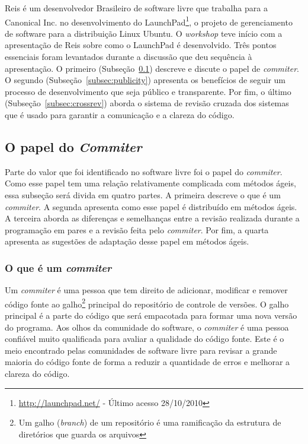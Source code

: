 Reis é um desenvolvedor Brasileiro de software livre que trabalha para
a Canonical Inc. no desenvolvimento do
LaunchPad\footnote{\url{http://launchpad.net/} - Último acesso
  28/10/2010}, o projeto de gerenciamento de software para a
distribuição Linux Ubuntu. O \emph{workshop} teve início com a
apresentação de Reis sobre como o LaunchPad é desenvolvido. Três
pontos essenciais foram levantados durante a discussão que deu
sequência à apresentação. O primeiro (Subseção~\ref{subsec:commiter})
descreve e discute o papel de \emph{commiter}.  O segundo
(Subseção~\ref{subsec:publicity}) apresenta os benefícios de seguir um
processo de desenvolvimento que seja público e transparente.  Por fim,
o último (Subseção~\ref{subsec:crossrev}) aborda o sistema de revisão
cruzada dos sistemas que é usado para garantir a comunicação e a
clareza do código.

\subsection{O papel do \emph{Commiter}}
\label{subsec:commiter}

Parte do valor que foi identificado no software livre foi o papel do
\emph{commiter}. Como esse papel tem uma relação relativamente
complicada com métodos ágeis, essa subseção será divida em quatro
partes. A primeira descreve o que é um \emph{commiter}. A segunda
apresenta como esse papel é distribuído em métodos ágeis. A terceira
aborda as diferenças e semelhanças entre a revisão realizada durante a
programação em pares e a revisão feita pelo \emph{commiter}. Por fim,
a quarta apresenta as sugestões de adaptação desse papel em métodos
ágeis.

\subsubsection{O que é um \emph{commiter}}

Um \emph{commiter} é uma pessoa que tem direito de adicionar,
modificar e remover código fonte ao galho\footnote{Um galho
  (\emph{branch}) de um repositório é uma ramificação da estrutura de
  diretórios que guarda os arquivos} principal do repositório de
controle de versões. O galho principal é a parte do código que será
empacotada para formar uma nova versão do programa. Aos olhos da
comunidade do software, o \emph{commiter} é uma pessoa confiável muito
qualificada para avaliar a qualidade do código fonte. Este é o meio
encontrado pelas comunidades de software livre para revisar a grande
maioria do código fonte de forma a reduzir a quantidade de erros e
melhorar a clareza do código.

